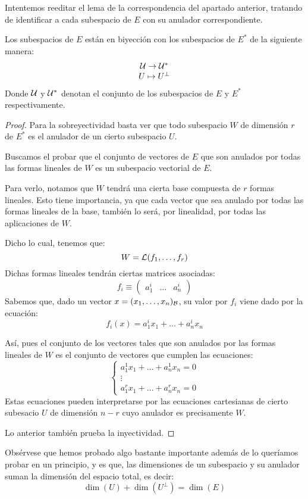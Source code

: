 Intentemos reeditar el lema de la correspondencia del apartado anterior, tratando de identificar a cada subespacio de $E$ con su anulador correspondiente.
\begin{lem}
	Los subespacios de $E$ están en biyección con los subespacios de $E^*$ de la siguiente manera:
	\[\begin{array}{c}
	\mathcal{U}\to\mathcal{U}^*\\
	U\mapsto U^{\perp}
	\end{array}\]
	Donde $\mathcal{U}$ y $\mathcal{U}^*$ denotan el conjunto de los subespacios de $E$ y $E^*$ respectivamente.
\end{lem}
\begin{proof}
	Para la sobreyectividad basta ver que todo subespacio $W$ de dimensión $r$ de $E^*$ es el anulador de un cierto subespacio $U$.
	
	Buscamos el probar que el conjunto de vectores de $E$ que son anulados por todas las formas lineales de $W$ es un subespacio vectorial de $E$.
	
	Para verlo, notamos que $W$ tendrá una cierta base compuesta de $r$ formas lineales. Esto tiene importancia, ya que cada vector que sea anulado por todas las formas lineales de la base, también lo será, por linealidad, por todas las aplicaciones de $W$.
	
	Dicho lo cual, tenemos que:
	\[W=\mathcal{L}(f_1,\dots,f_r)\]
	Dichas formas lineales tendrán ciertas matrices asociadas:
	\[f_i\equiv\begin{pmatrix}
	a_1^i & \dots & a_n^i
	\end{pmatrix}\]
	Sabemos que, dado un vector $x=(x_1,\dots,x_n)_{\mathcal{B}}$, su valor por $f_i$ viene dado por la ecuación:
	\[f_i(x)=a_1^ix_1+\dots+a_n^ix_n\]
	
	Así, pues el conjunto de los vectores tales que son anulados por las formas lineales de $W$ es el conjunto de vectores que cumplen las ecuaciones:
	\[\begin{cases}
	a_1^1x_1+\dots+a_n^1x_n=0\\
	\vdots\\
	a_1^rx_1+\dots+a_n^rx_n=0
	\end{cases}\]
	Estas ecuaciones pueden interpretarse por las ecuaciones cartesianas de cierto subesacio $U$ de dimensión $n-r$ cuyo anulador es precisamente $W$.
	
	Lo anterior también prueba la inyectividad.
\end{proof}
Obsérvese que hemos probado algo bastante importante además de lo queríamos probar en un principio, y es que, las dimensiones de un subespacio y su anulador suman la dimensión del espacio total, es decir:
\begin{equation}
	\dim(U)+\dim(U^{\perp})=\dim(E)
\end{equation}


